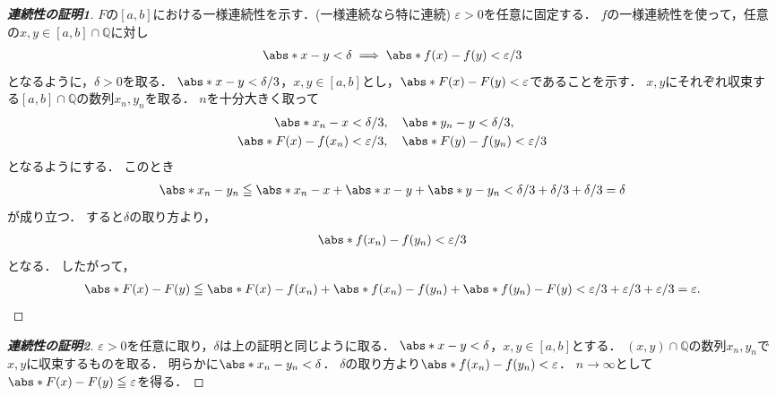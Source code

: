 \documentclass[a4paper,10pt,fleqn]{ltjsarticle}
\begin{document}
\begin{leftbar}
    \begin{proof}[\textup{\textbf{連続性の証明1}}]
        $F$の$[a,b]$における一様連続性を示す．(一様連続なら特に連続)
        $\varepsilon >0$を任意に固定する．
        $f$の一様連続性を使って，任意の$x,y \in [a,b] \cap \mathbb{Q}$に対し
        \begin{align*}
            \abs*{x-y} < \delta \implies \abs*{f(x) - f(y)} < \varepsilon/3
        \end{align*}
        となるように，$\delta > 0$を取る．
        $\abs*{x-y} < \delta/3$，$x,y \in [a,b]$とし，$\abs*{F(x)-F(y)} < \varepsilon$であることを示す．
        $x,y$にそれぞれ収束する$[a,b] \cap \mathbb{Q}$の数列$x_n,y_n$を取る．
        $n$を十分大きく取って
        \begin{align*}
            \abs*{x_n-x}       & < \delta/3, \quad \abs*{y_n-y} < \delta/3,                \\
            \abs*{F(x)-f(x_n)} & < \varepsilon/3, \quad \abs*{F(y)-f(y_n)} < \varepsilon/3
        \end{align*}
        となるようにする．
        このとき
        \begin{align*}
            \abs*{x_n-y_n} \le \abs*{x_n-x} + \abs*{x-y} + \abs*{y-y_n} < \delta/3 + \delta/3 + \delta/3 = \delta
        \end{align*}
        が成り立つ．
        すると$\delta$の取り方より，
        \begin{align*}
            \abs*{f(x_n)-f(y_n)} < \varepsilon/3
        \end{align*}
        となる．
        したがって，
        \begin{align*}
            \abs*{F(x)-F(y)} \le \abs*{F(x)-f(x_n)} + \abs*{f(x_n)-f(y_n)} + \abs*{f(y_n)-F(y)}
            < \varepsilon/3 + \varepsilon/3 + \varepsilon/3 = \varepsilon.
        \end{align*}
    \end{proof}
\end{leftbar}

\begin{leftbar}
    \begin{proof}[\textup{\textbf{連続性の証明2}}]
        $\varepsilon>0$を任意に取り，$\delta$は上の証明と同じように取る．
        $\abs*{x-y} < \delta$，$x,y \in [a,b]$とする．
        $(x,y) \cap \mathbb{Q}$の数列$x_n,y_n$で$x,y$に収束するものを取る．
        明らかに$\abs*{x_n-y_n}<\delta$．
        $\delta$の取り方より$\abs*{f(x_n)-f(y_n)}<\varepsilon$．
        $n \to \infty$として$\abs*{F(x)-F(y)} \le \varepsilon$を得る．
    \end{proof}
\end{leftbar}
\end{document}
